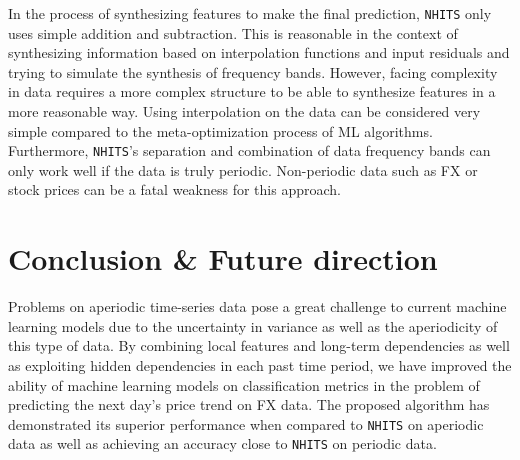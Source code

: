 \documentclass[aps,prb,groupedaddress,twocolumn,showpacs,dvipdfmx,superscriptaddress,pdftex]{revtex4-2}
\begin{document}

In the process of synthesizing features to make the final prediction, \verb|NHITS| only uses simple addition and subtraction. This is reasonable in the context of synthesizing information based on interpolation functions and input residuals and trying to simulate the synthesis of frequency bands. However, facing complexity in data requires a more complex structure to be able to synthesize features in a more reasonable way. Using interpolation on the data can be considered very simple compared to the meta-optimization process of ML algorithms. Furthermore, \verb|NHITS|'s separation and combination of data frequency bands can only work well if the data is truly periodic. Non-periodic data such as FX or stock prices can be a fatal weakness for this approach.

\section{Conclusion \& Future direction}
\label{sec.conc}


Problems on aperiodic time-series data pose a great challenge to current machine learning models due to the uncertainty in variance as well as the aperiodicity of this type of data. By combining local features and long-term dependencies as well as exploiting hidden dependencies in each past time period, we have improved the ability of machine learning models on classification metrics in the problem of predicting the next day's price trend on FX data. The proposed algorithm has demonstrated its superior performance when compared to \verb|NHITS| on aperiodic data as well as achieving an accuracy close to \verb|NHITS| on periodic data.
\end{document}
